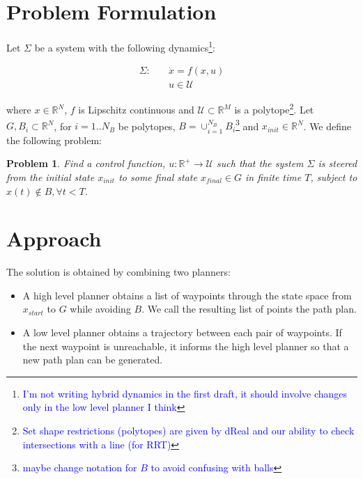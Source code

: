 \documentclass[12pt]{article}
\newtheorem{problem}{Problem}
\newcommand\fran[1]{\textcolor{blue}{#1}}
\newcommand\ffran[1]{\textcolor{blue}{\footnote{\fran{#1}}}}
\begin{document}
\section{Problem Formulation}
\label{sec:problem_formulation}

Let $\Sigma$ be a system with the following dynamics\ffran{I'm not writing hybrid dynamics in the first draft, it should involve changes only in the low level planner I think}:

\begin{equation}
    \label{eq:sigma}
    \begin{split}
        \Sigma : \quad &\dot x = f(x, u) \\
                       &u \in \mathcal{U}
    \end{split}
\end{equation}

where $x \in \mathbb{R}^N$, $f$ is Lipschitz continuous and $\mathcal{U} \subset \mathbb{R}^M$ is a polytope\ffran{Set shape restrictions (polytopes) are given by dReal and our ability to check intersections with a line (for RRT)}. Let $G, B_i \subset \mathbb{R}^N$, for $i = 1..N_B$ be polytopes, $B = \cup_{i=1}^{N_B} B_i$\ffran{maybe change notation for $B$ to avoid confusing with balls} and $x_{init} \in \mathbb{R}^N$. We define the following problem:

\begin{problem}\label{pr:reach}
Find a control function, $u : \mathbb{R}^+ \rightarrow \mathcal{U}$ such that the system $\Sigma$ is steered from the initial state $x_{init}$ to some final state $x_{final} \in G$ in finite time $T$, subject to $x(t) \notin B, \forall t < T$.
\end{problem}

\section{Approach}
\label{sec:approach}

The solution is obtained by combining two planners: 

\begin{itemize}
    \item A high level planner obtains a list of waypoints through the state space from $x_{start}$ to $G$ while avoiding $B$. We call the resulting list of points the path plan.
    \item A low level planner obtains a trajectory between each pair of waypoints. If the next waypoint is unreachable, it informs the high level planner so that a new path plan can be generated.
\end{itemize}
\end{document}
